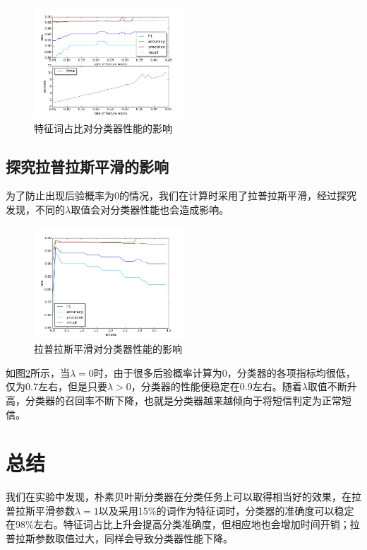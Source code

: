 \documentclass[a4paper, twocolumn, 12pt]{article}
\begin{document}
\begin{figure}
    \centering
    \includegraphics[width=0.5\textwidth]{fig_1.jpg}
    \caption{特征词占比对分类器性能的影响}
    \label{fig_1}
\end{figure}

\subsection{探究拉普拉斯平滑的影响}
为了防止出现后验概率为0的情况，我们在计算时采用了拉普拉斯平滑，经过探究发现，不同的$\lambda$取值会对分类器性能也会造成影响。\\


\begin{figure}[htbp]
    \centering
    \includegraphics[width=0.5\textwidth]{fig_2.jpg}
    \caption{拉普拉斯平滑对分类器性能的影响}
    \label{fig_2}
\end{figure}

如图\ref{fig_2}所示，当$\lambda=0$时，由于很多后验概率计算为0，分类器的各项指标均很低，仅为0.7左右，但是只要$\lambda>0$，分类器的性能便稳定在0.9左右。随着$\lambda$取值不断升高，分类器的召回率不断下降，也就是分类器越来越倾向于将短信判定为正常短信。

\section{总结}
我们在实验中发现，朴素贝叶斯分类器在分类任务上可以取得相当好的效果，在拉普拉斯平滑参数$\lambda=1$以及采用15\%的词作为特征词时，分类器的准确度可以稳定在98\%左右。特征词占比上升会提高分类准确度，但相应地也会增加时间开销；拉普拉斯参数取值过大，同样会导致分类器性能下降。
\end{document}
